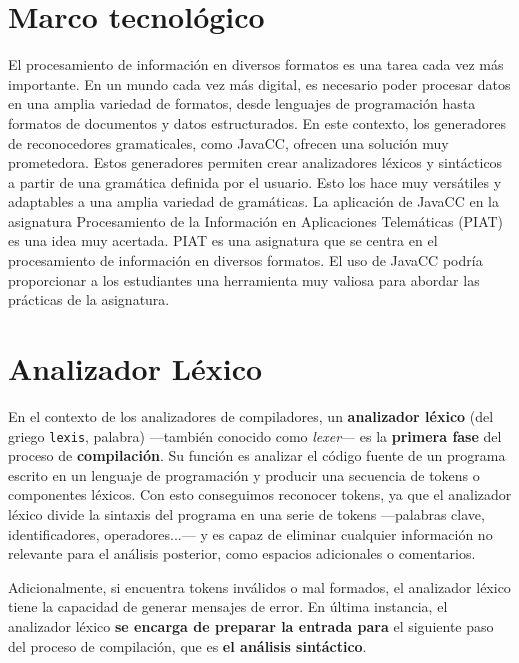 \section{Marco tecnológico}
El procesamiento de información en diversos formatos es una tarea cada vez más importante. En un mundo cada vez más digital, es necesario poder procesar datos en una amplia variedad de formatos, desde lenguajes de programación hasta formatos de documentos y datos estructurados.
En este contexto, los generadores de reconocedores gramaticales, como JavaCC, ofrecen una solución muy prometedora. Estos generadores permiten crear analizadores léxicos y sintácticos a partir de una gramática definida por el usuario. Esto los hace muy versátiles y adaptables a una amplia variedad de gramáticas.
La aplicación de JavaCC en la asignatura Procesamiento de la Información en Aplicaciones Telemáticas (PIAT) es una idea muy acertada. PIAT es una asignatura que se centra en el procesamiento de información en diversos formatos. El uso de JavaCC podría proporcionar a los estudiantes una herramienta muy valiosa para abordar las prácticas de la asignatura.





\section{Analizador Léxico}
En el contexto de los analizadores de compiladores, un \textbf{analizador léxico} (del griego \lstinline|lexis|, palabra) ---también conocido como \textit{lexer}--- es la \textbf{primera fase} del proceso de \textbf{compilación}. Su función es analizar el código fuente de un programa escrito en un lenguaje de programación y producir una secuencia de tokens o componentes léxicos\cite{lexer}. Con esto conseguimos reconocer tokens, ya que el analizador léxico divide la sintaxis del programa en una serie de tokens ---palabras clave, identificadores, operadores...--- y es capaz de eliminar cualquier información no relevante para el análisis posterior, como espacios adicionales o comentarios.

Adicionalmente, si encuentra tokens inválidos o mal formados, el analizador léxico tiene la capacidad de generar mensajes de error. En última instancia, el analizador léxico \textbf{se encarga de preparar la entrada para} el siguiente paso del proceso de compilación, que es \textbf{el análisis sintáctico}.




